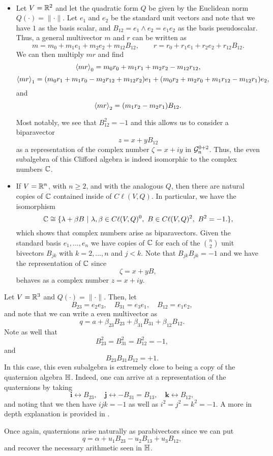 \begin{example}
\label{ex:complex_representation}~
\begin{itemize}
    \item Let $V=\R^2$ and let the quadratic form $Q$ be given by the Euclidean norm $Q(\cdot)=\|\cdot\|$.  Let $e_1$ and $e_2$ be the standard unit vectors and note that we have $1$ as the basis scalar, and $B_{12} = e_1\wedge e_2 = e_1e_2$ as the basis pseudoscalar.  Thus, a general multivector $m$ and $r$ can be written as
\[
m = m_0 + m_1 e_1 + m_2 e_2 + m_{12} B_{12}, \qquad r = r_0 +r_1 e_1 + r_2 e_2 + r_{12}B_{12}.
\]
We can then multiply $mr$ and find
\[
\proj{0}{mr} = m_0r_0 + m_1 r_1 + m_2 r_2 - m_{12}r_{12},
\]
\[
\proj{1}{mr} = (m_0 r_1 + m_1 r_0 - m_2 r_{12} + m_{12} r_2) e_1 + (m_0 r_2 + m_2 r_0 + m_1r_{12} - m_{12} r_1) e_2,
\]
and
\[
\proj{2}{mr} = (m_1r_2 - m_2 r_1)B_{12}.
\]

Most notably, we see that $B_{12}^2=-1$ and this allows us to consider a biparavector
\[
z = x + y B_{12} 
\]
as a representation of the complex number $\zeta = x+ iy$ in $\G_n^{0+2}$.  Thus, the even subalgebra of this Clifford algebra is indeed isomorphic to the complex numbers $\C$. 

    \item If $V =\R^n$, with $n\geq 2$, and with the analogous $Q$, then there are natural copies of $\C$ contained inside of $C\ell(V,Q)$. In particular, we have the isomorphism
    \[
        \C \cong \{\lambda + \beta B ~\vert~ \lambda,\beta \in C\ell(V,Q)^0,~ B \in C\ell(V,Q)^2,~ B^2=-1. \},
    \]
   which shows that complex numbers arise as biparavectors. Given the standard basis $e_1,\dots,e_n$ we have copies of $\C$ for each of the ${ n \choose 2}$ unit bivectors $B_{jk}$ with $k=2,\dots,n$ and $j<k$. Note that $B_{jk}B_{jk}=-1$ and we have the representation of $\C$ since
    \[
        \zeta = x + yB,
    \]
    behaves as a complex number $z=x+iy$.
\end{itemize}
\end{example}

\begin{example}
\label{ex:quaternions}
Let $V=\R^3$ and $Q(\cdot)=\|\cdot \|$.  Then, let
\[
B_{23} = e_2 e_3, \quad B_{31} = e_3 e_1, \quad B_{12} = e_1 e_2,
\]
and note that we can write a even multivector as
\[
q = a + \beta_{23} B_{23} + \beta_{31} B_{31} + \beta_{12} B_{12}.
\]
Note as well that
\[
B_{23}^2 = B_{31}^2 = B_{12}^2 = -1,
\]
and
\[
B_{23}B_{31}B_{12} = +1.
\]
In this case, this even subalgebra is extremely close to being a copy of the quaternion algebra $\quat$. Indeed, one can arrive at a representation of the quaternions by taking
\[
\boldsymbol{i} \leftrightarrow B_{23}, \quad \boldsymbol{j} \leftrightarrow -B_{31}=B_{13}, \quad \boldsymbol{k} \leftrightarrow B_{12},
\]
and noting that we then have $ijk=-1$ as well as $i^2=j^2=k^2=-1$. A more in depth explanation is provided in \cite{doran_geometric_2003}.

Once again, quaternions arise naturally as parabivectors since we can put
\[
q= \alpha + u_1B_{23} - u_2 B_{13} + u_3 B_{12},
\]
and recover the necessary arithmetic seen in $\quat$.
\end{example}

